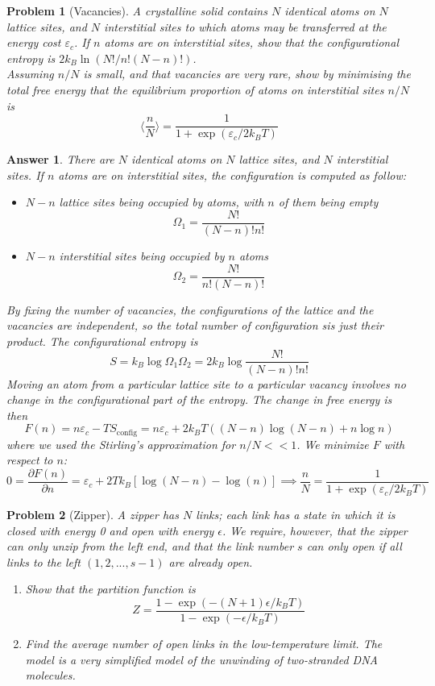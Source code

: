 \documentclass[a4paper]{article}
\theoremstyle{new2}
\newtheorem{ans}{Answer}[section]
\theoremstyle{new}
\newtheorem{qns}{Problem}[section]
\begin{document}
\newpage
\begin{qns}[Vacancies]
A crystalline solid contains $N$ identical atoms on $N$ lattice sites, and $N$ interstitial sites to which atoms may be transferred at the energy cost $\varepsilon_c$. If $n$ atoms are on interstitial sites, show that the configurational entropy is $2k_B\ln(N!/n!(N −n)!)$.\\[5pt]
Assuming $n/N$ is small, and that vacancies are very rare, show by minimising the total free energy that the equilibrium proportion of atoms on interstitial sites $n/N$ is
$$\bigg\langle\frac{n}{N}\bigg\rangle=\frac{1}{1+\exp(\varepsilon_c/2k_BT)}$$
\end{qns}
\begin{ans}
There are $N$ identical atoms on $N$ lattice sites, and $N$ interstitial sites. If $n$ atoms are on interstitial sites, the configuration is computed as follow:
\begin{itemize}
    \item $N-n$ lattice sites being occupied by atoms, with $n$ of them being empty
    $$\Omega_1=\frac{N!}{(N-n)!n!}$$
    \item $N-n$ interstitial sites being occupied by $n$ atoms
    $$\Omega_2=\frac{N!}{n!(N-n)!}$$
\end{itemize}
By fixing the number of vacancies, the configurations of the lattice and the vacancies are independent, so the total number of configuration sis just their product. The configurational entropy is
$$S=k_B\log\Omega_1\Omega_2=2k_B\log\frac{N!}{(N-n)!n!}$$
Moving an atom from a particular lattice site to a particular vacancy involves no change in the configurational part of the entropy. The change in free energy is then
$$F(n)=n\varepsilon_c-TS_{\text{config}}=n\varepsilon_c+2k_BT((N-n)\log(N-n)+n\log n)$$
where we used the Stirling's approximation for $n/N<<1$. We minimize $F$ with respect to $n$:
$$0=\frac{\partial F(n)}{\partial n}=\varepsilon_c+2Tk_B[\log(N-n)-\log(n)]\implies\frac{n}{N}=\frac{1}{1+\exp(\varepsilon_c/2k_BT)}$$
\end{ans}
\begin{qns}[Zipper]
A zipper has $N$ links; each link has a state in which it is closed with energy 0 and open with energy $\epsilon$. We require, however, that the zipper can only unzip from the left end, and that the link number $s$ can only open if all links to the left $(1,2,...,s−1)$ are already open. 
\begin{enumerate}[label=(\alph*)]
\item Show that the partition function is
$$Z=\frac{1-\exp(-(N+1)\epsilon/k_BT)}{1-\exp(-\epsilon/k_BT)}$$
\item Find the average number of open links in the low-temperature limit. The model is a very simplified model of the unwinding of two-stranded DNA molecules.
\end{enumerate}
\end{qns}
\end{document}
